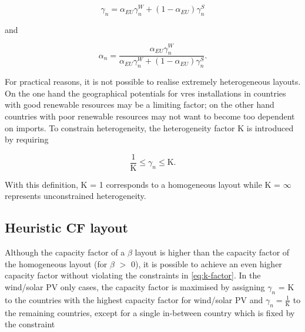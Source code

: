 \documentclass[a4paper, 5p, sort&compress]{elsarticle}%
\begin{document}

\begin{equation}
  \label{eq:9}
  \gamma_{n} = \alpha_{EU} \gamma^{W}_{n} + (1-\alpha_{EU}) \gamma^{S}_{n}
\end{equation}

and

\begin{equation}
  \label{eq:9}
  \alpha_{n} = \frac{\alpha_{EU} \gamma_{n}^{W}}{\alpha_{EU} \gamma_{n}^{W} + (1-\alpha_{EU}) \gamma_{n}^{S}} .
\end{equation}


For practical reasons, it is not possible to realise extremely
heterogeneous layouts. On the one hand the geographical potentials for
\gls{vres} installations in countries with good renewable resources may be a limiting factor; on the
other hand countries with poor renewable resources may not want to become too dependent on imports.
To constrain heterogeneity, the heterogeneity
factor K is introduced by requiring

\begin{equation}
  \label{eq:k-factor}
  \frac{1}{\text{K}} \leq \gamma_{n} \leq \text{K} .
\end{equation}

With this definition, K = 1 corresponds to a homogeneous layout while
K = $\infty$ represents unconstrained heterogeneity.


\subsection{Heuristic CF layout}
\label{sec:CF-layout}


Although the capacity factor of a $\beta$ layout is higher than the
capacity factor of the homogeneous layout (for $\beta$ $>$ 0), it is
possible to achieve an even higher capacity factor without violating
the constraints in \cref{eq:k-factor}. In the wind/solar PV only
cases, the capacity factor is maximised by assigning $\gamma_{n}$ = K to
the countries with the highest capacity factor for wind/solar PV and
$\gamma_{n} = \frac{1}{\text{K}}$ to the remaining countries, except for a
single in-between country which is fixed by the constraint
\end{document}
